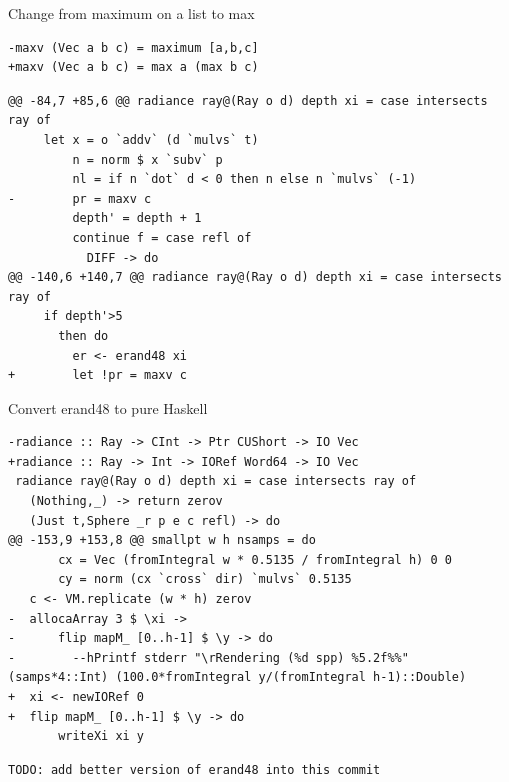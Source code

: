 \documentclass[8pt]{beamer}
\begin{document}
\begin{frame}[fragile]{Change from maximum on a list to max}
\begin{verbatim}
-maxv (Vec a b c) = maximum [a,b,c]
+maxv (Vec a b c) = max a (max b c)
\end{verbatim}

\begin{verbatim}
@@ -84,7 +85,6 @@ radiance ray@(Ray o d) depth xi = case intersects ray of
     let x = o `addv` (d `mulvs` t)
         n = norm $ x `subv` p
         nl = if n `dot` d < 0 then n else n `mulvs` (-1)
-        pr = maxv c
         depth' = depth + 1
         continue f = case refl of
           DIFF -> do
@@ -140,6 +140,7 @@ radiance ray@(Ray o d) depth xi = case intersects ray of
     if depth'>5
       then do
         er <- erand48 xi
+        let !pr = maxv c
\end{verbatim}

\end{frame}

\begin{frame}[fragile]{Convert erand48 to pure Haskell}
\begin{verbatim}
-radiance :: Ray -> CInt -> Ptr CUShort -> IO Vec
+radiance :: Ray -> Int -> IORef Word64 -> IO Vec
 radiance ray@(Ray o d) depth xi = case intersects ray of
   (Nothing,_) -> return zerov
   (Just t,Sphere _r p e c refl) -> do
@@ -153,9 +153,8 @@ smallpt w h nsamps = do
       cx = Vec (fromIntegral w * 0.5135 / fromIntegral h) 0 0
       cy = norm (cx `cross` dir) `mulvs` 0.5135
   c <- VM.replicate (w * h) zerov
-  allocaArray 3 $ \xi ->
-      flip mapM_ [0..h-1] $ \y -> do
-        --hPrintf stderr "\rRendering (%d spp) %5.2f%%" (samps*4::Int) (100.0*fromIntegral y/(fromIntegral h-1)::Double)
+  xi <- newIORef 0
+  flip mapM_ [0..h-1] $ \y -> do
       writeXi xi y
\end{verbatim}

\begin{verbatim}
TODO: add better version of erand48 into this commit
\end{verbatim}
\end{frame}
\end{document}
